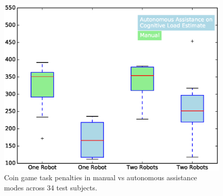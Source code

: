 \documentclass{sig-alternate}
\begin{document}
\begin{figure}
\centering
\includegraphics[width=.5\textwidth]{BoxWiskerTimesCompMaualVsAuto2.eps}
\caption{Coin game task penalties in manual vs autonomous assistance modes across 34 test subjects.}
\label{fig:BoxWiskersTimeComp}
\end{figure}

\end{document}
